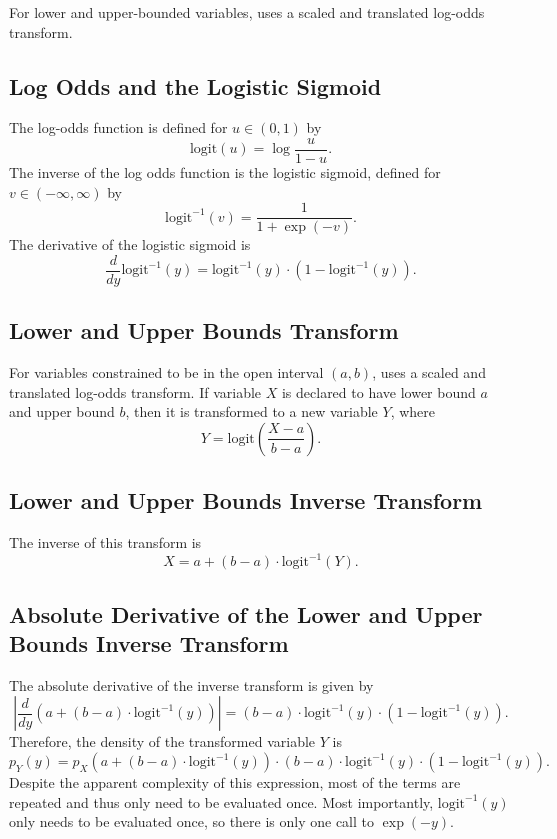 For lower and upper-bounded variables, \Stan uses a scaled and
translated log-odds transform.

\subsection{Log Odds and the Logistic Sigmoid}

The log-odds function is defined for $u \in (0,1)$ by
%
\[
\mbox{logit}(u) = \log \frac{u}{1 - u}.
\]
% 
The inverse of the log odds function is the logistic sigmoid, defined 
for $v \in (-\infty,\infty)$ by
%
\[
\mbox{logit}^{-1}(v) = \frac{1}{1 + \exp(-v)}.
\]
% 
The derivative of the logistic sigmoid is
%
\[
\frac{d}{dy} \mbox{logit}^{-1}(y) 
= \mbox{logit}^{-1}(y) \cdot \left( 1 - \mbox{logit}^{-1}(y) \right).
\]

\subsection{Lower and Upper Bounds Transform}

For variables constrained to be in the open interval $(a,b)$, \Stan
uses a scaled and translated log-odds transform.  If variable $X$ is
declared to have lower bound $a$ and upper bound $b$, then it is
transformed to a new variable $Y$, where
%
\[
Y = \mbox{logit} \left( \frac{X - a}{b - a} \right).
\]
%

\subsection{Lower and Upper Bounds Inverse Transform}

The inverse of this transform is
%
\[
X = a + (b - a) \cdot \mbox{logit}^{-1}(Y).
\]
%

\subsection{Absolute Derivative of the Lower and Upper Bounds Inverse
  Transform}

The absolute derivative of the inverse transform is given by
\[
\left|  
  \frac{d}{dy} 
    \left( 
      a + (b - a) \cdot \mbox{logit}^{-1}(y)
    \right)
  \right|
= (b - a)
    \cdot \mbox{logit}^{-1}(y)
    \cdot \left( 1 - \mbox{logit}^{-1}(y) \right).
\]
Therefore, the density of the transformed variable $Y$ is
%
\[
p_Y(y) 
= 
 p_X \! \left( a + (b - a) \cdot \mbox{logit}^{-1}(y) \right)
    \cdot (b - a)
    \cdot \mbox{logit}^{-1}(y)
    \cdot \left( 1 - \mbox{logit}^{-1}(y) \right).
\]
%
Despite the apparent complexity of this expression, most of the terms
are repeated and thus only need to be evaluated once.  Most
importantly, $\mbox{logit}^{-1}(y)$ only needs to be evaluated once,
so there is only one call to $\exp(-y)$.


